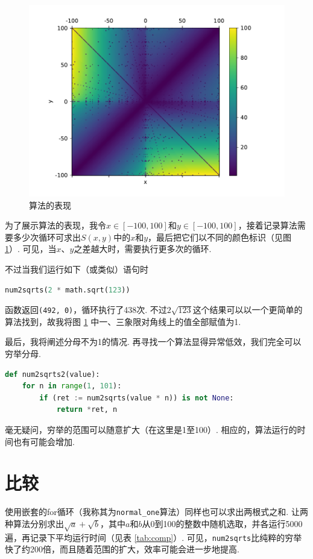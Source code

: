 \documentclass[a4paper, UTF8]{ctexart}
\begin{document}
\begin{figure}[tb]
    \centering
    \includegraphics[width=0.8\linewidth]{perform.pdf}
    \caption{算法的表现}
    \label{fig:perform1}
\end{figure}

为了展示算法的表现，我令$x\in[-100,100]$和$y\in[-100,100]$，接着记录算法需要多少次循环可求出$S(x,y)$中的$x$和$y$，最后把它们以不同的颜色标识（见图 \ref{fig:perform1}）. 可见，当$x$、$y$之差越大时，需要执行更多次的循环.

不过当我们运行如下（或类似）语句时
\begin{lstlisting}[language=python]
num2sqrts(2 * math.sqrt(123))
\end{lstlisting}
函数返回\verb|(492, 0)|，循环执行了438次. 不过$2\sqrt{123}$这个结果可以以一个更简单的算法找到，故我将图 \ref{fig:perform1} 中一、三象限对角线上的值全部赋值为1.

最后，我将阐述分母不为1的情况. 再寻找一个算法显得异常低效，我们完全可以穷举分母.
\begin{lstlisting}[language=python, name=example2]
def num2sqrts2(value):
    for n in range(1, 101):
        if (ret := num2sqrts(value * n)) is not None:
            return *ret, n
\end{lstlisting}
毫无疑问，穷举的范围可以随意扩大（在这里是1至100）. 相应的，算法运行的时间也有可能会增加.

\section{比较}
使用嵌套的for循环（我称其为\verb|normal_one|算法）同样也可以求出两根式之和. 让两种算法分别求出$\sqrt{a}+\sqrt{b}$，其中$a$和$b$从0到100的整数中随机选取，并各运行5000遍，再记录下平均运行时间（见表 \ref{tab:comp}）. 可见，\verb|num2sqrts|比纯粹的穷举快了约200倍，而且随着范围的扩大，效率可能会进一步地提高.
\end{document}
